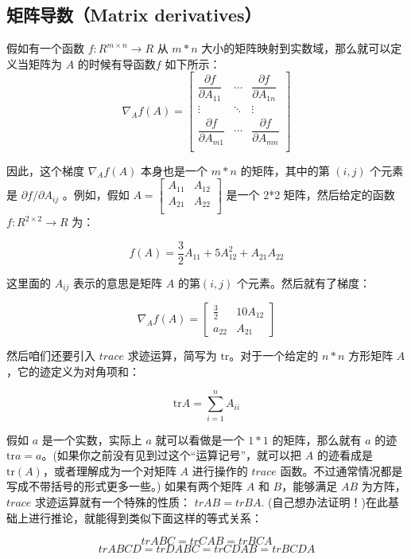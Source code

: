 \documentclass[UTF8]{ctexart}
\begin{document}
		\subsection{矩阵导数（Matrix derivatives）}
		假如有一个函数 $ f : R^{m×n} \longrightarrow R $ 从 $ m * n $ 大小的矩阵映射到实数域，那么就可以定义当矩阵为 $A$ 的时候有导函数$ f $ 如下所示：
		\[ \nabla_{A}f(A)=\begin{bmatrix}
		\dfrac{\partial f}{\partial A_{11}} & \cdots & \dfrac{\partial f}{\partial A_{1n}}\\
		\vdots & \ddots & \vdots \\
		\dfrac{\partial f}{\partial A_{m1}} & \cdots & \dfrac{\partial f}{\partial A_{mn}}\\
		\end{bmatrix}  \]
		
		因此，这个梯度 $ \nabla_{A}f(A) $  本身也是一个 $m*n$ 的矩阵，其中的第 $(i,j)$ 个元素是 $ \partial f / \partial A_{ij} $ 。例如，假如 $ A=\begin{bmatrix}
		A_{11} & A_{12} \\ A_{21} & A_{22} \\
		\end{bmatrix} $ 是一个 2*2 矩阵，然后给定的函数 $f : R^{2×2} \longrightarrow R$ 为：
		
		\[ f(A) = \frac{3}{2}A_{11} + 5A^{2}_{12} + A_{21}A_{22} \]
		
		这里面的 $ A_{ij} $ 表示的意思是矩阵 $A$ 的第$(i,j)$ 个元素。然后就有了梯度：
		
		\[ \nabla_{A}f(A) = \begin{bmatrix}
		\frac{3}{2} & 10A_{12} \\ a_{22} & A_{21}
		\end{bmatrix} \]
		
		然后咱们还要引入 $trace$ 求迹运算，简写为 $\mathrm{tr}$。对于一个给定的 $n*n$ 方形矩阵 $A$，它的迹定义为对角项和：
		
		\[ \mathrm{tr}A= \sum^{n}_{i=1}A_{ii} \]
		
		假如 $a$ 是一个实数，实际上 $a$ 就可以看做是一个 $1*1$ 的矩阵，那么就有 $a$ 的迹 $\mathrm{tr} a = a$。(如果你之前没有见到过这个“运算记号”，就可以把 $A$ 的迹看成是 $\mathrm{tr}(A)$，或者理解成为一个对矩阵 $A$ 进行操作的 $trace$ 函数。不过通常情况都是写成不带括号的形式更多一些。) 
		如果有两个矩阵 $A$ 和 $B$，能够满足 $AB$ 为方阵，$trace$ 求迹运算就有一个特殊的性质： $trAB = trBA$. (自己想办法证明！)在此基础上进行推论，就能得到类似下面这样的等式关系： 
		
		\[ trABC = trCAB = trBCA  \]
		\[ trABCD = trDABC = trCDAB = trBCDA \]
		
\end{document}
